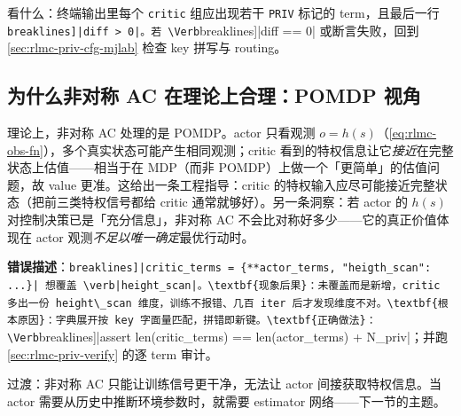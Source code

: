 看什么：终端输出里每个 \verb|critic| 组应出现若干 \verb|PRIV| 标记的 term，且最后一行 \Verb[breaklines]|diff > 0|。若 \Verb[breaklines]|diff == 0| 或断言失败，回到 \cref{sec:rlmc-priv-cfg-mjlab} 检查 key 拼写与 routing。

\subsection{为什么非对称 AC 在理论上合理：POMDP 视角}
\label{sec:rlmc-priv-pomdp}

理论上，非对称 AC 处理的是 POMDP。actor 只看观测 $o=h(s)$（\cref{eq:rlmc-obs-fn}），多个真实状态可能产生相同观测；critic 看到的特权信息让它\emph{接近}在完整状态上估值——相当于在 MDP（而非 POMDP）上做一个「更简单」的估值问题，故 value 更准。这给出一条工程指导：critic 的特权输入应尽可能接近完整状态（把前三类特权信号都给 critic 通常就够好）。另一条洞察：若 actor 的 $h(s)$ 对控制决策已是「充分信息」，非对称 AC 不会比对称好多少——它的真正价值体现在 actor 观测\emph{不足以唯一确定}最优行动时。

\begin{pitfall}
\textbf{错误描述}：\Verb[breaklines]|critic_terms = {**actor_terms, "heigth_scan": ...}| 想覆盖 \verb|height_scan|。\textbf{现象后果}：未覆盖而是新增，critic 多出一份 height\_scan 维度，训练不报错、几百 iter 后才发现维度不对。\textbf{根本原因}：字典展开按 key 字面量匹配，拼错即新键。\textbf{正确做法}：\Verb[breaklines]|assert len(critic_terms) == len(actor_terms) + N_priv|；并跑 \cref{sec:rlmc-priv-verify} 的逐 term 审计。
\end{pitfall}

\begin{practice}[本节练习]
\end{practice}

过渡：非对称 AC 只能让训练信号更干净，无法让 actor 间接获取特权信息。当 actor 需要从历史中推断环境参数时，就需要 estimator 网络——下一节的主题。

